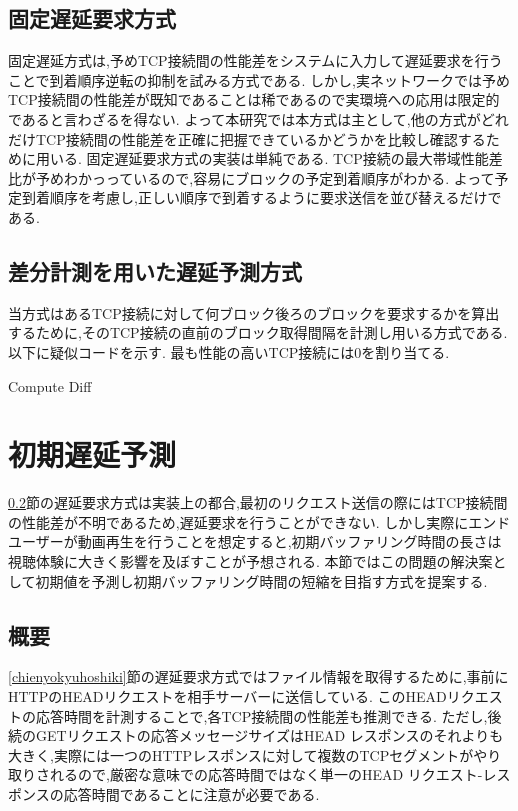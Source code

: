 \documentclass[a4j,12pt]{gradthesis_utf8}
\begin{document}
\subsection{固定遅延要求方式}
\label{kotei}
固定遅延方式は,予めTCP接続間の性能差をシステムに入力して遅延要求を行うことで到着順序逆転の抑制を試みる方式である.
しかし,実ネットワークでは予めTCP接続間の性能差が既知であることは稀であるので実環境への応用は限定的であると言わざるを得ない.
よって本研究では本方式は主として,他の方式がどれだけTCP接続間の性能差を正確に把握できているかどうかを比較し確認するために用いる.
固定遅延要求方式の実装は単純である.
TCP接続の最大帯域性能差比が予めわかっっているので,容易にブロックの予定到着順序がわかる.
よって予定到着順序を考慮し,正しい順序で到着するように要求送信を並び替えるだけである.

\subsection{差分計測を用いた遅延予測方式}
\label{diff}
当方式はあるTCP接続に対して何ブロック後ろのブロックを要求するかを算出するために,そのTCP接続の直前のブロック取得間隔を計測し用いる方式である.
以下に疑似コードを示す.
最も性能の高いTCP接続には0を割り当てる.

\begin{algorithm}
	\caption{Compute Diff}
	\begin{algorithmic}[1]
		\Else 
		\EndIf
	\end{algorithmic}
\end{algorithm}

\newpage

\section{初期遅延予測}
\label{shoki}
\ref{diff}節の遅延要求方式は実装上の都合,最初のリクエスト送信の際にはTCP接続間の性能差が不明であるため,遅延要求を行うことができない.
しかし実際にエンドユーザーが動画再生を行うことを想定すると,初期バッファリング時間の長さは視聴体験に大きく影響を及ぼすことが予想される.
本節ではこの問題の解決案として初期値を予測し初期バッファリング時間の短縮を目指す方式を提案する.

\subsection{概要}
\label{shokigaiyo}
\ref{chienyokyuhoshiki}節の遅延要求方式ではファイル情報を取得するために,事前にHTTPのHEADリクエストを相手サーバーに送信している.
このHEADリクエストの応答時間を計測することで,各TCP接続間の性能差も推測できる.
ただし,後続のGETリクエストの応答メッセージサイズはHEAD レスポンスのそれよりも大きく,実際には一つのHTTPレスポンスに対して複数のTCPセグメントがやり取りされるので,厳密な意味での応答時間ではなく単一のHEAD リクエスト-レスポンスの応答時間であることに注意が必要である.
\end{document}
